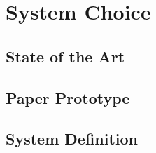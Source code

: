 \chapter{System Choice}


\section{State of the Art}
\label{StateOfTheArt}


\section{Paper Prototype}


\section{System Definition}

